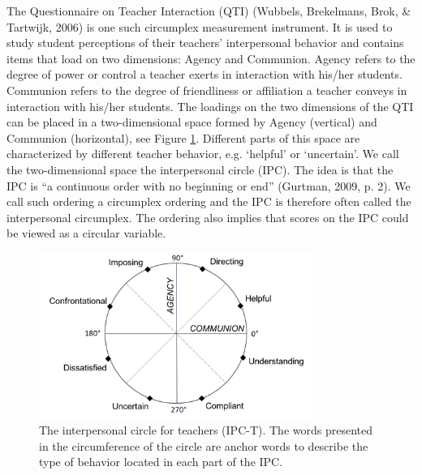 \documentclass[11pt,]{article}
\begin{document}
The Questionnaire on Teacher Interaction (QTI) (Wubbels, Brekelmans,
Brok, \& Tartwijk, 2006) is one such circumplex measurement instrument.
It is used to study student perceptions of their teachers' interpersonal
behavior and contains items that load on two dimensions: Agency and
Communion. Agency refers to the degree of power or control a teacher
exerts in interaction with his/her students. Communion refers to the
degree of friendliness or affiliation a teacher conveys in interaction
with his/her students. The loadings on the two dimensions of the QTI can
be placed in a two-dimensional space formed by Agency (vertical) and
Communion (horizontal), see Figure \ref{QTI}. Different parts of this
space are characterized by different teacher behavior, e.g. `helpful' or
`uncertain'. We call the two-dimensional space the interpersonal circle
(IPC). The idea is that the IPC is ``a continuous order with no
beginning or end'' (Gurtman, 2009, p. 2). We call such ordering a
circumplex ordering and the IPC is therefore often called the
interpersonal circumplex. The ordering also implies that scores on the
IPC could be viewed as a circular variable.

\begin{figure}
\centering
\includegraphics[width = 0.8\textwidth]{Plots/IPC-T.png}
\caption{The interpersonal circle for teachers (IPC-T). The words presented in
the circumference of the circle are anchor words to describe the type of
behavior located in each part of the IPC.}
\label{QTI}
\end{figure}
\end{document}
